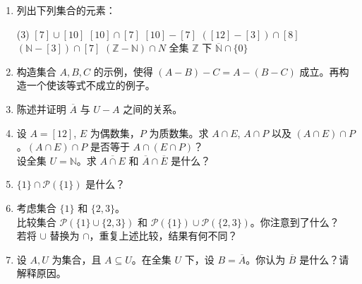 \begin{enumerate}[label=(\arabic*)]
    \item 列出下列集合的元素：
        \begin{tasks}(3)
            \task $[7] \cup [10]$
            \task $[10] \cap [7]$
            \task $[10] - [7]$
            \task $([12] - [3]) \cap [8]$
            \task $(\mathbb{N} - [3]) \cap [7]$
            \task $(\mathbb{Z}-\mathbb{N}) \cap N$
            \task 全集 $\mathbb{Z}$ 下 $\overline{\mathbb{N}} \cap \{0\}$
        \end{tasks}
    \item 构造集合 $A,B,C$ 的示例，使得 $(A - B) - C = A - (B - C)$ 成立。再构造一个使该等式不成立的例子。
    \item 陈述并证明 $\overline{A}$ 与 $U - A$ 之间的关系。
    \item 设 $A = [12]$, $E$ 为偶数集，$P$ 为质数集。求 $A \cap E$, $A \cap P$ 以及 $(A \cap E) \cap P$。$(A \cap E) \cap P$ 是否等于 $A \cap (E \cap P)$？\\
    设全集 $U = \mathbb{N}$。求 $\overline{A \cap E}$ 和 $\overline{A} \cap \overline{E}$ 是什么？
    \item $ \{1\} \cap \mathcal{P}(\{1\})$ 是什么？
    \item 考虑集合 $\{1\}$ 和 $\{2, 3\}$。\\
    比较集合 $\mathcal{P}(\{1\} \cup \{2, 3\})$ 和 $\mathcal{P}(\{1\}) \cup \mathcal{P}(\{2, 3\})$。你注意到了什么？\\
    若将 $\cup$ 替换为 $\cap$，重复上述比较，结果有何不同？\label{exc:exercises3.5.6}
    \item 设 $A, U$ 为集合，且 $A \subseteq U$。在全集 $U$ 下，设 $B = \overline{A}$。你认为 $\overline{B}$ 是什么？请解释原因。
\end{enumerate}
